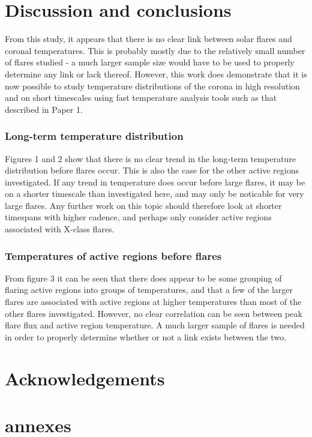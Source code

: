 \documentclass{article}
\begin{document}
\section{Discussion and conclusions}
From this study, it appears that there is no clear link between solar flares and coronal temperatures.
This is probably mostly due to the relatively small number of flares studied - a much larger sample size would have to be used to properly determine any link or lack thereof.
However, this work does demonstrate that it is now possible to study temperature distributions of the corona in high resolution and on short timescales using fast temperature analysis tools such as that described in Paper 1.

\subsubsection{Long-term temperature distribution}
Figures 1 and 2 show that there is no clear trend in the long-term temperature distribution before flares occur.
This is also the case for the other active regions investigated. If any trend in temperature does occur before large flares, it may be on a shorter timescale than investigated here, and may only be noticable for very large flares.
Any further work on this topic should therefore look at shorter timespans with higher cadence, and perhaps only consider active regions associated with X-class flares.

\subsubsection{Temperatures of active regions before flares}
From figure 3 it can be seen that there does appear to be some grouping of flaring active regions into groups of temperatures, and that a few of the larger flares are associated with active regions at higher temperatures than most of the other flares investigated.
However, no clear correlation can be seen between peak flare flux and active region temperature.
A much larger sample of flares is needed in order to properly determine whether or not a link exists between the two.

\section*{Acknowledgements}

\section*{annexes}



\end{document}
